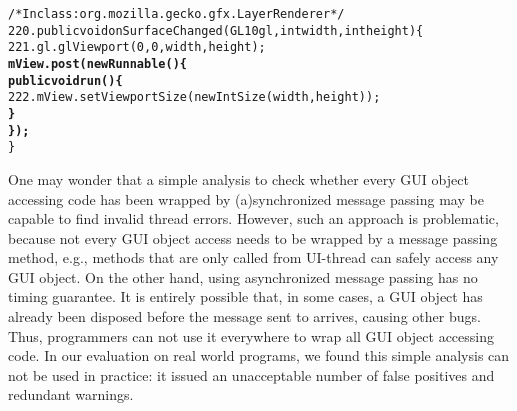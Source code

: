 \begin{CodeOut}
\begin{alltt}
     /* In class: org.mozilla.gecko.gfx.LayerRenderer */
220. public void onSurfaceChanged(GL10 gl, int width, int height) \{
221.     gl.glViewport(0, 0, width, height);
         \textbf{mView.post(new Runnable() \{}
             \textbf{public void run() \{}
222.             mView.setViewportSize(new IntSize(width, height));
             \textbf{\}}
         \textbf{\});}
     \}
\end{alltt}
\end{CodeOut}

One may wonder that a simple analysis to check whether every GUI object
accessing code has been wrapped by (a)synchronized message passing may
be capable to find invalid thread errors. However, such an approach is problematic,
because not every GUI object access needs to be wrapped by a message passing
method, e.g., methods that are only called from UI-thread can safely
access any GUI object. On the other hand, using asynchronized message passing has no timing
guarantee. It is entirely possible that, in some cases, a GUI object has already been
disposed before the message sent to arrives, causing other bugs. 
Thus, programmers can not use it everywhere to wrap all GUI object accessing code.
In our evaluation on real world programs, we found this simple analysis 
can not be used in practice: it issued
an unacceptable number of false positives and redundant warnings.




